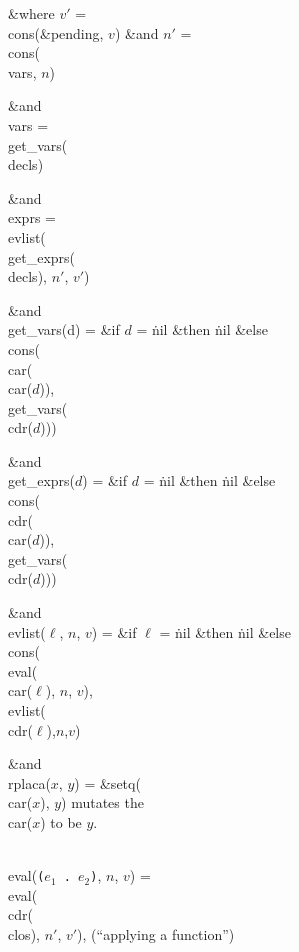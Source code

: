 \&{where} $v'$ = \\{cons}(\&{pending}, $v$) \&{and} $n'$ = \\{cons}(\\{vars},
$n$)

\&{and}
\\{vars} = \\{get\_vars}(\\{decls})

\&{and}
\\{exprs} = \\{evlist}(\\{get\_exprs}(\\{decls}), $n'$, $v'$)

\&{and}
\\{get\_vars}(d) = \&{if} $d$ = \.{nil} \&{then} \.{nil}
\&{else} \\{cons}(\\{car}(\\{car}($d$)),\\{get\_vars}(\\{cdr}($d$)))

\&{and} \\{get\_exprs}($d$) = \&{if} $d$ = \.{nil} \&{then} \.{nil}
\&{else} \\{cons}(\\{cdr}(\\{car}($d$)),\\{get\_vars}(\\{cdr}($d$)))

\&{and} \\{evlist}($\ell$, $n$, $v$) = \&{if} $\ell$ = \.{nil} \&{then}
\.{nil} \&{else} \\{cons}(\\{eval}(\\{car}($\ell$), $n$, $v$), \\{evlist}(%
\\{cdr}($\ell$),$n$,$v$)

\&{and} \\{rplaca}($x$, $y$) = \&{setq}(\\{car}($x$), $y$) mutates
the \\{car}($x$) to be $y$.

\bull
\\{eval}({\tt ($e_{1}$ {.} $e_{2}$)}, $n$, $v$) =
\\{eval}(\\{cdr}(\\{clos}), $n'$, $v'$), (``applying a function'')

